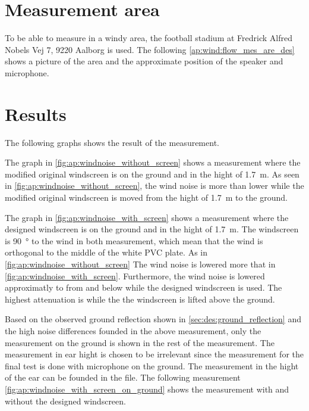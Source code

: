 \section*{Measurement area}
To be able to measure in a windy area, the football stadium at Fredrick Alfred Nobels Vej 7, 9220 Aalborg is used. The following \autoref{ap:wind:flow_mes_are_des} shows a picture of the area and the approximate position of the speaker and microphone.


\section*{Results}

The following graphs shows the result of the measurement. 



The graph in \autoref{fig:ap:windnoise_without_screen} shows a measurement where the modified original windscreen is on the ground and in the hight of \SI{1.7}{\meter}. 
As seen in \autoref{fig:ap:windnoise_without_screen}, the wind noise is more than  lower while the modified original windscreen is moved from the hight of \SI{1.7}{\meter} to the ground. 



The graph in \autoref{fig:ap:windnoise_with_screen} shows a measurement where the designed windscreen is on the ground and in the hight of \SI{1.7}{\meter}. The windscreen is \SI{90}{\degree} to the wind in both measurement, which mean that the wind is orthogonal to the middle of the white PVC plate. 
As in \autoref{fig:ap:windnoise_without_screen} The wind noise is lowered more that   in \autoref{fig:ap:windnoise_with_screen}. Furthermore, the wind noise is lowered approximatly  to  from  and below while the designed windscreen is used. The highest attenuation is while the the windscreen is lifted above the ground.

Based on the observed ground reflection shown in \autoref{sec:des:ground_reflection} and the high noise differences founded in the above measurement, only the measurement on the ground is shown in the rest of the measurement. The measurement in ear hight is chosen to be irrelevant since the measurement for the final test is done with microphone on the ground. The measurement in the hight of the ear can be founded in the file. The following measurement \autoref{fig:ap:windnoise_with_screen_on_ground} shows the measurement with and without the designed windscreen. 


